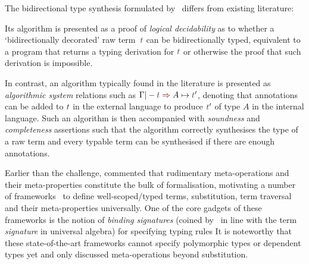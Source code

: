 \begin{remark}\label{re:type-synthesis-as-decidability-proof}
The bidirectional type synthesis formulated by~\citeauthor{Wadler2022} differs from existing literature:
\begin{enumerate*}
  \item Its algorithm is presented as a proof of \emph{logical decidability} as to whether a `bidirectionally decorated' raw term~$\isTerm{t}$ can be bidirectionally typed, equivalent to a program that returns a typing derivation for $\isTerm{t}$ or otherwise the proof that such derivation is impossible.
  \item In contrast, an algorithm typically found in the literature is presented as \emph{algorithmic system} relations such as $\Gamma |- \isTerm{t} \syn A \mapsto \isTerm{t}'$, denoting that annotations can be added to $\isTerm{t}$ in the external language to produce $\isTerm{t}'$ of type $A$ in the internal language.
    Such an algorithm is then accompanied with \emph{soundness} and \emph{completeness} assertions such that the algorithm correctly synthesises the type of a raw term and every typable term can be synthesised if there are enough annotations.
\end{enumerate*}
\end{remark}

Earlier than the \PoplMark challenge, \citet{Altenkirch1993} commented that rudimentary meta-operations and their meta-properties constitute the bulk of formalisation, motivating a number of frameworks~\citep{Ahrens2018,Fiore2022,Gheri2020,Ahrens2022,Allais2021} to define well-scoped/typed terms, substitution, term traversal and their meta-properties universally.
One of the core gadgets of these frameworks is the notion of \emph{binding signatures} (coined by~\citet{Aczel1978} in line with the term \emph{signature} in universal algebra) for specifying typing rules
It is noteworthy that these state-of-the-art frameworks cannot specify polymorphic types or dependent types yet and only \citeauthor{Allais2021} discussed meta-operations beyond substitution.


